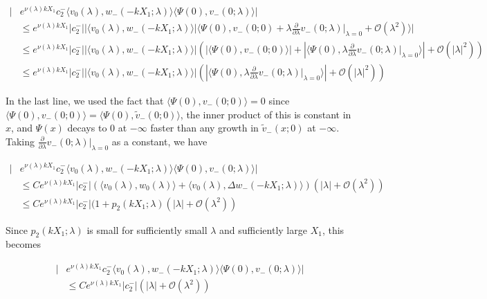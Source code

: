 \documentclass[12pt]{article}
\begin{document}
\begin{enumerate}
\begin{align*}
|&e^{\nu(\lambda)k X_1} c_2^- \langle v_0(\lambda), w_-(-k X_1; \lambda) \rangle \langle \Psi(0), v_-(0; \lambda) \rangle|\\
&\leq e^{\nu(\lambda)k X_1}|c_2^-| |\langle v_0(\lambda), w_-(-k X_1; \lambda) \rangle|\langle \Psi(0), v_-(0; 0) + \lambda \frac{\partial}{\partial \lambda}v_-(0; \lambda)\Big|_{\lambda = 0} + \mathcal{O}(\lambda^2) \rangle| \\
&\leq e^{\nu(\lambda)k X_1}|c_2^-| |\langle v_0(\lambda), w_-(-k X_1; \lambda) \rangle| \left( |\langle \Psi(0), v_-(0; 0) \rangle| +  |\langle \Psi(0), \lambda \frac{\partial}{\partial \lambda}v_-(0; \lambda)\Big|_{\lambda = 0} \rangle| + \mathcal{O}(|\lambda|^2) \right) \\
&\leq e^{\nu(\lambda)k X_1}|c_2^-| |\langle v_0(\lambda), w_-(-k X_1; \lambda) \rangle| \left( |\langle \Psi(0), \lambda \frac{\partial}{\partial \lambda}v_-(0; \lambda)\Big|_{\lambda = 0} \rangle| + \mathcal{O}(|\lambda|^2) \right)
\end{align*}

In the last line, we used the fact that $\langle \Psi(0), v_-(0; 0) \rangle = 0$ since $\langle \Psi(0), v_-(0; 0) \rangle = \langle \Psi(0), \tilde{v}_-(0; 0) \rangle$, the inner product of this is constant in $x$, and $\Psi(x)$ decays to 0 at $-\infty$ faster than any growth in $\tilde{v}_-(x; 0)$ at $-\infty$. Taking $\frac{\partial}{\partial \lambda}v_-(0; \lambda)\Big|_{\lambda = 0}$ as a constant, we have

\begin{align*}
|&e^{\nu(\lambda)k X_1} c_2^- \langle v_0(\lambda), w_-(-k X_1; \lambda) \rangle \langle \Psi(0), v_-(0; \lambda) \rangle| \\
&\leq C e^{\nu(\lambda)k X_1}|c_2^-| (\langle v_0(\lambda), w_0(\lambda) \rangle + \langle v_0(\lambda), \Delta w_-(-k X_1; \lambda) \rangle) (|\lambda| + \mathcal{O}(\lambda^2) ) \\
&\leq C e^{\nu(\lambda)k X_1}|c_2^-| (1 + p_2(k X_1; \lambda) (|\lambda| + \mathcal{O}(\lambda^2) )
\end{align*}

Since $p_2(k X_1; \lambda)$ is small for sufficiently small $\lambda$ and sufficiently large $X_1$, this becomes

\begin{align*}
|&e^{\nu(\lambda)k X_1} c_2^- \langle v_0(\lambda), w_-(-k X_1; \lambda) \rangle \langle \Psi(0), v_-(0; \lambda) \rangle| \\
&\leq C e^{\nu(\lambda)k X_1}|c_2^-| (|\lambda| + \mathcal{O}(\lambda^2) )
\end{align*}


\end{enumerate}
\end{document}
